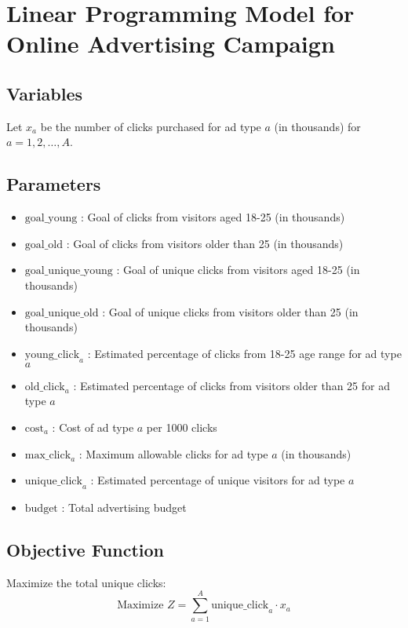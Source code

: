\documentclass{article}
\begin{document}
\section*{Linear Programming Model for Online Advertising Campaign}

\subsection*{Variables}
Let \( x_a \) be the number of clicks purchased for ad type \( a \) (in thousands) for \( a = 1, 2, \ldots, A \).

\subsection*{Parameters}
\begin{itemize}
    \item \( \text{goal\_young} \) : Goal of clicks from visitors aged 18-25 (in thousands)
    \item \( \text{goal\_old} \) : Goal of clicks from visitors older than 25 (in thousands)
    \item \( \text{goal\_unique\_young} \) : Goal of unique clicks from visitors aged 18-25 (in thousands)
    \item \( \text{goal\_unique\_old} \) : Goal of unique clicks from visitors older than 25 (in thousands)
    \item \( \text{young\_click}_a \) : Estimated percentage of clicks from 18-25 age range for ad type \( a \)
    \item \( \text{old\_click}_a \) : Estimated percentage of clicks from visitors older than 25 for ad type \( a \)
    \item \( \text{cost}_a \) : Cost of ad type \( a \) per 1000 clicks
    \item \( \text{max\_click}_a \) : Maximum allowable clicks for ad type \( a \) (in thousands)
    \item \( \text{unique\_click}_a \) : Estimated percentage of unique visitors for ad type \( a \)
    \item \( \text{budget} \) : Total advertising budget
\end{itemize}

\subsection*{Objective Function}
Maximize the total unique clicks:
\[
\text{Maximize } Z = \sum_{a=1}^{A} \text{unique\_click}_a \cdot x_a
\]
\end{document}
